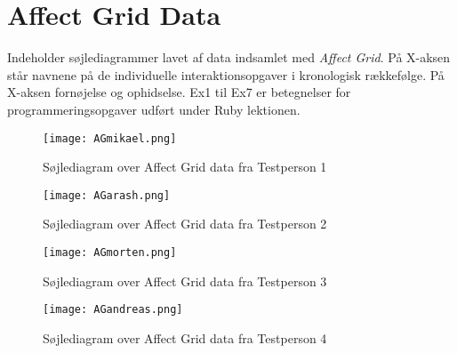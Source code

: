 \chapter{Affect Grid Data}\label{app:AG}
Indeholder søjlediagrammer lavet af data indsamlet med \textit{Affect Grid}. På X-aksen står navnene på de individuelle interaktionsopgaver i kronologisk rækkefølge. På X-aksen fornøjelse og ophidselse. Ex1 til Ex7 er betegnelser for programmeringsopgaver udført under Ruby lektionen.


\begin{figure}[h]
\centering
\texttt{[image: AGmikael.png]}
\caption{Søjlediagram over Affect Grid data fra Testperson 1}
\label{fig:AGMikael}
\end{figure}

\begin{figure}[h]
\centering
\texttt{[image: AGarash.png]}
\caption{Søjlediagram over Affect Grid data fra Testperson 2}
\label{fig:AGArash}
\end{figure}

\begin{figure}[h]
\centering
\texttt{[image: AGmorten.png]}
\caption{Søjlediagram over Affect Grid data fra Testperson 3}
\label{fig:AGMorten}
\end{figure}

\begin{figure}[h]
\centering
\texttt{[image: AGandreas.png]}
\caption{Søjlediagram over Affect Grid data fra Testperson 4}
\label{fig:AGAndreas}
\end{figure}